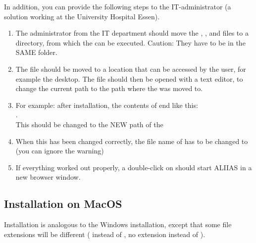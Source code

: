 In addition, you can provide the following steps to the IT-administrator (a solution working at the University Hospital Essen).

\begin{enumerate}
    
    \item The administrator from the IT department should move the , ,  and  files to a directory, from which the  can be executed. Caution: They have to be in the SAME folder. 
    
    \item The  file should be moved to a location that can be accessed by the user, for example the desktop. The file should then be opened with a text editor, to change the current path to the path where the  was moved to.
    \label{item:admin}
    
    \item For example: after installation, the contents of  end like this: \\ . \\ This should be changed to the NEW path of the 
    
    \item When this has been changed correctly, the file name of  has to be changed to  (you can ignore the warning)
    
    \item If everything worked out properly, a double-click on  should start ALIIAS in a new browser window.
\end{enumerate} 

\subsection*{Installation on MacOS}
Installation is analogous to the Windows installation, except that some file extensions will be different ( instead of , no extension instead of ).

\vspace{2mm}

\small\setlength\fboxsep{5pt}\setlength\fboxrule{1pt}

\small\setlength\fboxsep{5pt}\setlength\fboxrule{1pt}

